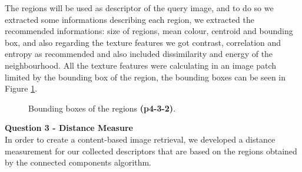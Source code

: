 \documentclass[12pt,a4paper]{article}
\begin{document}
	The regions will be used as descriptor of the query image, and to do so we extracted some informations describing each region, we extracted the recommended informations: size of regions, mean colour, centroid and bounding box, and also regarding the texture features we got contrast, correlation and entropy as recommended and also included dissimilarity and energy of the neighbourhood. All the texture features were calculating in an image patch limited by the bounding box of the region, the bounding boxes can be seen in Figure \ref{fig:bbox}.

\begin{figure}[!h]
	\centering
		{
			\setlength{\fboxsep}{1pt}
			\setlength{\fboxrule}{1pt}
		}
	\caption{Bounding boxes of the regions \textbf{(p4-3-2)}.}
	\label{fig:bbox}
\end{figure}


\newpage

\textbf{\LARGE Question 3 - Distance Measure} \\

In order to create a content-based image retrieval, we developed a distance measurement for our collected descriptors that are based on the regions obtained by the connected components algorithm.
\end{document}

